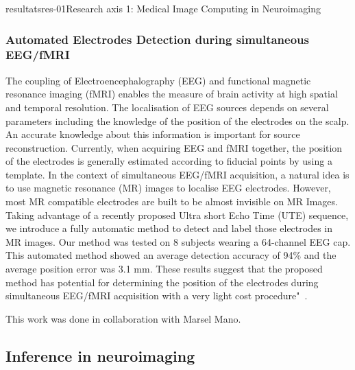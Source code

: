 \documentclass{ra2018}
\begin{document}
\begin{module}{resultats}{res-01}{Research axis 1: Medical Image Computing in Neuroimaging}
\subsubsection{Automated Electrodes Detection during simultaneous EEG/fMRI}
\begin{participants}
\end{participants}
The coupling of Electroencephalography (EEG) and functional magnetic resonance imaging (fMRI) enables the measure of brain activity at high spatial and temporal resolution. The localisation of EEG sources depends on several parameters including the knowledge of the position of the electrodes on the scalp. An accurate knowledge about this information is important for source reconstruction. Currently, when acquiring EEG and fMRI together, the position of the electrodes is generally estimated according to fiducial points by using a template. In the context of simultaneous EEG/fMRI acquisition, a natural idea is to use magnetic resonance (MR) images to localise EEG electrodes. However, most MR compatible electrodes are built to be almost invisible on MR Images. Taking advantage of a recently proposed Ultra short Echo Time (UTE) sequence, we introduce a fully automatic method to detect and label those electrodes in MR images. Our method was tested on 8 subjects wearing a 64-channel EEG cap. This automated method showed an average detection accuracy of 94\% and the average position error was 3.1 mm. These results suggest that the proposed method has potential for determining the position of the electrodes during simultaneous EEG/fMRI acquisition with a very light cost procedure"~\cite{fleury:hal-01939735, fleury:hal-01874815}.

This work was done in collaboration with Marsel Mano.

\subsection{Inference in neuroimaging}

\end{module}
\end{document}
